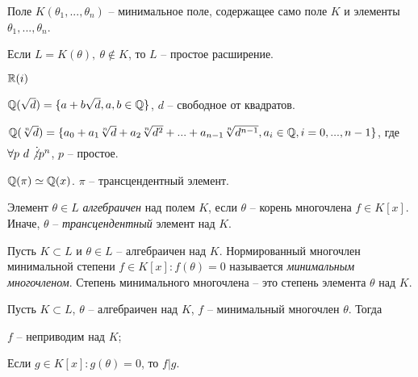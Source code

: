 
\begin{Def}
	Поле $K(\theta_1, ..., \theta_n)$ -- минимальное поле, содержащее само поле $K$ и элементы $\theta_1, ..., \theta_n$. 
\end{Def}

\begin{Def}
	Если $L = K(\theta), \ \theta \notin K$, то $L$ -- простое расширение. 
\end{Def}

\begin{Example}
	$\mathbb{R}(i)$ 
\end{Example}
	
\begin{Example}
	$\mathbb{Q}(\sqrt{d}) = \{a + b\sqrt{d}, a, b \in \mathbb{Q}\}$, $d$ -- свободное от квадратов.
\end{Example}

\begin{Example}
	$\mathbb{Q}(\sqrt[n]{d}) = \{a_0 + a_1\sqrt[n]{d} + a_2 \sqrt[n]{d^2} + ... + a_{n - 1}\sqrt[n]{d^{n - 1}}, a_i \in \mathbb{Q}, i = 0, ..., n - 1\}$, где $\forall p \ d \not\vdots p^n$, $p$ -- простое.
\end{Example}

\begin{Example}
	$\mathbb{Q}(\pi) \simeq \mathbb{Q}(x)$. $\pi$ -- трансцендентный элемент.
\end{Example}

\begin{Def}
	Элемент $\theta \in L$ \textit{алгебраичен}  над полем $K$, если $\theta$ -- корень многочлена $f \in K[x]$.
	Иначе, $\theta$ -- \textit{трансцендентный}  элемент над $K$.
\end{Def}
	
\begin{Def}
	Пусть $K \subset L$ и $\theta \in L$ -- алгебраичен над $K$. Нормированный многочлен минимальной степени $f \in K[x] : f(\theta) = 0$ называется
	\textit{минимальным многочленом}. Степень минимального многочлена -- это степень элемента $\theta$ над $K$.  
\end{Def}

\begin{Thm}
	Пусть $K \subset L$, $\theta$ -- алгебраичен над $K$, $f$ -- минимальный многочлен $\theta$.
	Тогда 
	\begin{MyList}
		\item $f$ -- неприводим над $K$;
		\item Если $g \in K[x] : g(\theta) = 0$, то $f | g$. 
	\end{MyList} 
\end{Thm}

